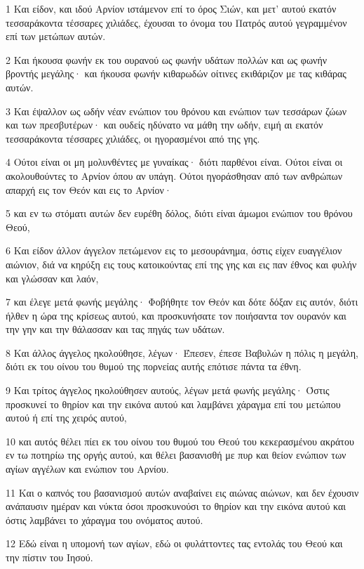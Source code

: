 \par 1 Και είδον, και ιδού Αρνίον ιστάμενον επί το όρος Σιών, και μετ' αυτού εκατόν τεσσαράκοντα τέσσαρες χιλιάδες, έχουσαι το όνομα του Πατρός αυτού γεγραμμένον επί των μετώπων αυτών.
\par 2 Και ήκουσα φωνήν εκ του ουρανού ως φωνήν υδάτων πολλών και ως φωνήν βροντής μεγάλης· και ήκουσα φωνήν κιθαρωδών οίτινες εκιθάριζον με τας κιθάρας αυτών.
\par 3 Και έψαλλον ως ωδήν νέαν ενώπιον του θρόνου και ενώπιον των τεσσάρων ζώων και των πρεσβυτέρων· και ουδείς ηδύνατο να μάθη την ωδήν, ειμή αι εκατόν τεσσαράκοντα τέσσαρες χιλιάδες, οι ηγορασμένοι από της γης.
\par 4 Ούτοι είναι οι μη μολυνθέντες με γυναίκας· διότι παρθένοι είναι. Ούτοι είναι οι ακολουθούντες το Αρνίον όπου αν υπάγη. Ούτοι ηγοράσθησαν από των ανθρώπων απαρχή εις τον Θεόν και εις το Αρνίον·
\par 5 και εν τω στόματι αυτών δεν ευρέθη δόλος, διότι είναι άμωμοι ενώπιον του θρόνου Θεού,
\par 6 Και είδον άλλον άγγελον πετώμενον εις το μεσουράνημα, όστις είχεν ευαγγέλιον αιώνιον, διά να κηρύξη εις τους κατοικούντας επί της γης και εις παν έθνος και φυλήν και γλώσσαν και λαόν,
\par 7 και έλεγε μετά φωνής μεγάλης· Φοβήθητε τον Θεόν και δότε δόξαν εις αυτόν, διότι ήλθεν η ώρα της κρίσεως αυτού, και προσκυνήσατε τον ποιήσαντα τον ουρανόν και την γην και την θάλασσαν και τας πηγάς των υδάτων.
\par 8 Και άλλος άγγελος ηκολούθησε, λέγων· Έπεσεν, έπεσε Βαβυλών η πόλις η μεγάλη, διότι εκ του οίνου του θυμού της πορνείας αυτής επότισε πάντα τα έθνη.
\par 9 Και τρίτος άγγελος ηκολούθησεν αυτούς, λέγων μετά φωνής μεγάλης· Όστις προσκυνεί το θηρίον και την εικόνα αυτού και λαμβάνει χάραγμα επί του μετώπου αυτού ή επί της χειρός αυτού,
\par 10 και αυτός θέλει πίει εκ του οίνου του θυμού του Θεού του κεκερασμένου ακράτου εν τω ποτηρίω της οργής αυτού, και θέλει βασανισθή με πυρ και θείον ενώπιον των αγίων αγγέλων και ενώπιον του Αρνίου.
\par 11 Και ο καπνός του βασανισμού αυτών αναβαίνει εις αιώνας αιώνων, και δεν έχουσιν ανάπαυσιν ημέραν και νύκτα όσοι προσκυνούσι το θηρίον και την εικόνα αυτού και όστις λαμβάνει το χάραγμα του ονόματος αυτού.
\par 12 Εδώ είναι η υπομονή των αγίων, εδώ οι φυλάττοντες τας εντολάς του Θεού και την πίστιν του Ιησού.
